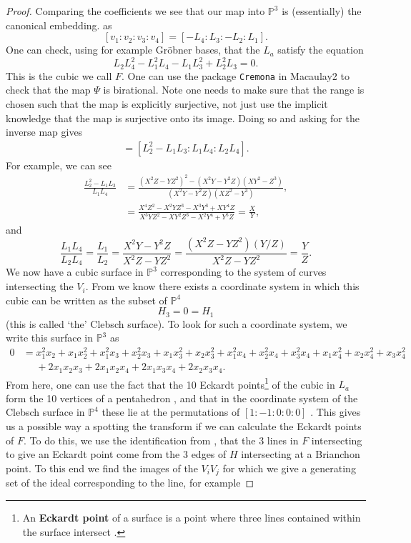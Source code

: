 \documentclass{amsart}
\newcommand{\bam}[1]{\textbf{#1}}
\newcommand{\pround}[1]{\left( #1 \right)}
\begin{document}
\begin{proof}
Comparing the coefficients we see that our map into $\mathbb{P}^3$ is (essentially) the canonical embedding. as 
\[
[v_1 : v_2 : v_3 : v_4 ] = [-L_4 : L_3 : -L_2 : L_1]  . 
\]
One can check, using for example Gr\"obner bases, that the $L_a$ satisfy the equation
\[
L_2 L_4^2 - L_1^2 L_4 - L_1 L_3^2 + L_2^2 L_3= 0. 
\]
This is the cubic we call $F$. One can use the package \texttt{Cremona} \cite{Stagliano2018} in Macaulay2 to check that the map $\Psi$ is birational. Note one needs to make sure that the range is chosen such that the map is explicitly surjective, not just use the implicit knowledge that the map is surjective onto its image. Doing so and asking for the inverse map gives 
\begin{align*}
    [X:Y:Z] = [L_2^2 - L_1 L_3 : L_1 L_4 : L_2 L_4] . 
\end{align*}
For example, we can see 
\begin{align*}
\frac{L_2^2 - L_1 L_3}{L_1 L_4} &= \frac{\pround{X^2 Z - Y Z^2}^2 - \pround{X^2 Y - Y^2 Z}\pround{X Y^2 - Z^3}}{\pround{X^2 Y - Y^2 Z} \pround{X Z^2 - Y^3}}  ,  \\
&= \frac{X^4 Z^2 -X^2 Y Z^3 -X^3 Y^3 + X Y^4 Z}{X^3 Y Z^2 - X Y^2 Z^3 - X^2 Y^4 + Y^5 Z} = \frac{X}{Y}  ,
\end{align*}
and
\[
\frac{L_1L_4}{L_2 L_4} = \frac{L_1}{L_2} = \frac{X^2 Y - Y^2 Z}{X^2 Z - Y Z^2 } = \frac{(X^2 Z - Y Z^2)(Y/Z)}{X^2 Z - Y Z^2 } = \frac{Y}{ Z}  . 
\]
We now have a cubic surface in $\mathbb{P}^3$ corresponding to the system of curves intersecting the $V_i$. From \cite[pp.~198-201]{Hirschfeld1986} we know there exists a coordinate system in which this cubic can be written as the subset of $\mathbb{P}^4$ 
\[
H_3 = 0 = H_1  
\]
(this is called `the' Clebsch surface). To look for such a coordinate system, we write this surface in $\mathbb{P}^3$ as 
\begin{align*}
0 &= x_1^{2} x_2 + x_1 x_2^{2} + x_1^{2} x_3 +  x_2^{2} x_3 + x_1 x_3^{2} + x_2 x_3^{2} + x_1^{2} x_4 +  x_2^{2} x_4  +  x_3^{2} x_4 + x_1 x_4^{2} + x_2 x_4^{2} + x_3 x_4^{2} \\
&\phantom{=} + 2 x_1 x_2 x_3 + 2 x_1 x_2 x_4 + 2 x_1 x_3 x_4 + 2 x_2 x_3 x_4   .
\end{align*}
From here, one can use the fact that the 10 Eckardt points\footnote{An \bam{Eckardt point} of a surface is a point where three lines contained within the surface intersect \cite{Hirschfeld1986}.} of the cubic in $L_a$ form the 10 vertices of a pentahedron \cite{Hirschfeld1986}, and that in the coordinate system of the Clebsch surface in $\mathbb{P}^4$ these lie at the permutations of $[1:-1:0:0:0]$ \cite{Edge1978}. This gives us a possible way a spotting the transform if we can calculate the Eckardt points of $F$. To do this, we use the identification from \cite{Dye1995}, that the 3 lines in $F$ intersecting to give an Eckardt point come from the 3 edges of $H$ intersecting at a Brianchon point. To this end we find the images of the $V_i V_j$ for which we give a generating set of the ideal corresponding to the line, for example 

\end{proof}
\end{document}
